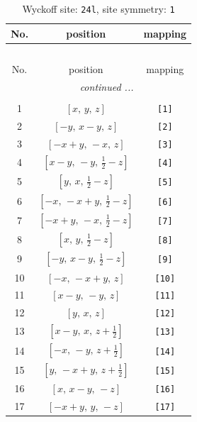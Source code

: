 \documentclass[fleqn,8pt]{jsarticle}
\begin{document}
\begin{longtable}{ccc}
\caption{Wyckoff site: {\tt 24l}, site symmetry: {\tt 1}}
 \\
 \hline \hline
No. & position & mapping \\ \hline \endfirsthead

\multicolumn{2}{l}{\tablename\ \thetable{}} \\
 \hline \hline
No. & position & mapping \\ \hline \endhead

 \hline \hline
\multicolumn{2}{r}{\footnotesize\it continued ...} \\ \endfoot

 \hline \hline
\multicolumn{2}{r}{} \\ \endlastfoot

1 & $\left[ x,\, y,\, z \right]$ & {\tt [1]} \\ \hline
2 & $\left[ - y,\, x - y,\, z \right]$ & {\tt [2]} \\ \hline
3 & $\left[ - x + y,\, - x,\, z \right]$ & {\tt [3]} \\ \hline
4 & $\left[ x - y,\, - y,\, \frac{1}{2} - z \right]$ & {\tt [4]} \\ \hline
5 & $\left[ y,\, x,\, \frac{1}{2} - z \right]$ & {\tt [5]} \\ \hline
6 & $\left[ - x,\, - x + y,\, \frac{1}{2} - z \right]$ & {\tt [6]} \\ \hline
7 & $\left[ - x + y,\, - x,\, \frac{1}{2} - z \right]$ & {\tt [7]} \\ \hline
8 & $\left[ x,\, y,\, \frac{1}{2} - z \right]$ & {\tt [8]} \\ \hline
9 & $\left[ - y,\, x - y,\, \frac{1}{2} - z \right]$ & {\tt [9]} \\ \hline
10 & $\left[ - x,\, - x + y,\, z \right]$ & {\tt [10]} \\ \hline
11 & $\left[ x - y,\, - y,\, z \right]$ & {\tt [11]} \\ \hline
12 & $\left[ y,\, x,\, z \right]$ & {\tt [12]} \\ \hline
13 & $\left[ x - y,\, x,\, z + \frac{1}{2} \right]$ & {\tt [13]} \\ \hline
14 & $\left[ - x,\, - y,\, z + \frac{1}{2} \right]$ & {\tt [14]} \\ \hline
15 & $\left[ y,\, - x + y,\, z + \frac{1}{2} \right]$ & {\tt [15]} \\ \hline
16 & $\left[ x,\, x - y,\, - z \right]$ & {\tt [16]} \\ \hline
17 & $\left[ - x + y,\, y,\, - z \right]$ & {\tt [17]} \\ \hline

\end{longtable}
\end{document}
